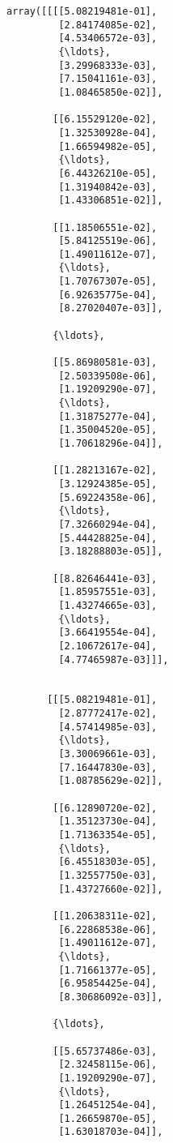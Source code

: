 \documentclass[11pt]{article}
\newcommand{\prompt}[4]{
        \llap{{\color{#2}[#3]: #4}}\vspace{-1.25em}
    }
\begin{document}
            \begin{tcolorbox}[breakable, boxrule=.5pt, size=fbox, pad at break*=1mm, opacityfill=0]
\prompt{Out}{outcolor}{26}{\hspace{3.5pt}}
\begin{Verbatim}[commandchars=\\\{\}]
array([[[[5.08219481e-01],
         [2.84174085e-02],
         [4.53406572e-03],
         {\ldots},
         [3.29968333e-03],
         [7.15041161e-03],
         [1.08465850e-02]],

        [[6.15529120e-02],
         [1.32530928e-04],
         [1.66594982e-05],
         {\ldots},
         [6.44326210e-05],
         [1.31940842e-03],
         [1.43306851e-02]],

        [[1.18506551e-02],
         [5.84125519e-06],
         [1.49011612e-07],
         {\ldots},
         [1.70767307e-05],
         [6.92635775e-04],
         [8.27020407e-03]],

        {\ldots},

        [[5.86980581e-03],
         [2.50339508e-06],
         [1.19209290e-07],
         {\ldots},
         [1.31875277e-04],
         [1.35004520e-05],
         [1.70618296e-04]],

        [[1.28213167e-02],
         [3.12924385e-05],
         [5.69224358e-06],
         {\ldots},
         [7.32660294e-04],
         [5.44428825e-04],
         [3.18288803e-05]],

        [[8.82646441e-03],
         [1.85957551e-03],
         [1.43274665e-03],
         {\ldots},
         [3.66419554e-04],
         [2.10672617e-04],
         [4.77465987e-03]]],


       [[[5.08219481e-01],
         [2.87772417e-02],
         [4.57414985e-03],
         {\ldots},
         [3.30069661e-03],
         [7.16447830e-03],
         [1.08785629e-02]],

        [[6.12890720e-02],
         [1.35123730e-04],
         [1.71363354e-05],
         {\ldots},
         [6.45518303e-05],
         [1.32557750e-03],
         [1.43727660e-02]],

        [[1.20638311e-02],
         [6.22868538e-06],
         [1.49011612e-07],
         {\ldots},
         [1.71661377e-05],
         [6.95854425e-04],
         [8.30686092e-03]],

        {\ldots},

        [[5.65737486e-03],
         [2.32458115e-06],
         [1.19209290e-07],
         {\ldots},
         [1.26451254e-04],
         [1.26659870e-05],
         [1.63018703e-04]],


\end{Verbatim}
\end{tcolorbox}
\end{document}

